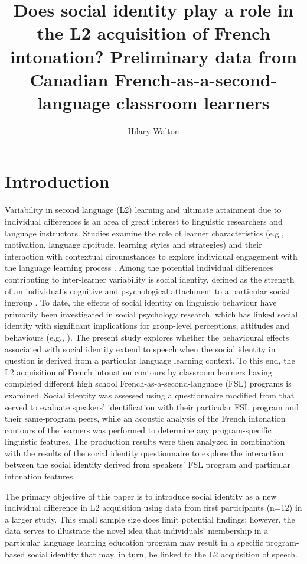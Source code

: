 \documentclass[output=paper,colorlinks,citecolor=brown,draftmode]{langscibook}
\author{Hilary Walton\orcid{}\affiliation{University of Toronto}}
\title{Does social identity play a role in the L2 acquisition of French intonation? Preliminary data from Canadian French-as-a-second-language classroom learners}
\begin{document}
\maketitle

\section{Introduction}
Variability in second language (L2) learning and ultimate attainment due to individual differences is an area of great interest to linguistic researchers and language instructors. Studies examine the role of learner characteristics (e.g., motivation, language aptitude, learning styles and strategies) and their interaction with contextual circumstances to explore individual engagement with the language learning process \citep{Dörnyei2005}. Among the potential individual differences contributing to inter-learner variability is social identity, defined as the strength of an individual’s cognitive and psychological attachment to a particular social ingroup \citep{Tajfel1978}. To date, the effects of social identity on linguistic behaviour have primarily been investigated in social psychology research, which has linked social identity with significant implications for group-level perceptions, attitudes and behaviours (e.g., \citealt{PerreaultBourhis1999, Reay:2010, SpearsEllemers:1999, TajfelFlament1971}). The present study explores whether the behavioural effects associated with social identity extend to speech when the social identity in question is derived from a particular language learning context. To this end, the L2 acquisition of French intonation contours by classroom learners having completed different high school French-as-a-second-language (FSL) programs is examined. Social identity was assessed using a questionnaire modified from \citet{LeachSpears2008} that served to evaluate speakers’ identification with their particular FSL program and their same-program peers, while an acoustic analysis of the French intonation contours of the learners was performed to determine any program-specific linguistic features. The production results were then analyzed in combination with the results of the social identity questionnaire to explore the interaction between the social identity derived from speakers’ FSL program and particular intonation features.


The primary objective of this paper is to introduce social identity as a new individual difference in L2 acquisition using data from first participants (n=12) in a larger study. This small sample size does limit potential findings; however, the data serves to illustrate the novel idea that individuals’ membership in a particular language learning education program may result in a specific program-based social identity that may, in turn, be linked to the L2 acquisition of speech.
\end{document}
